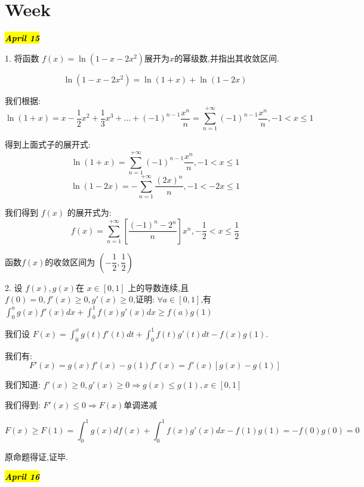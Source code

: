 \section{Week }
\hl{\textbf{\textit{April 15}}}

1. 将函数 $f(x)=\ln(1-x-2x^2)$展开为$x$的幂级数,并指出其收敛区间.
\begin{solution}
	$$\ln(1-x-2x^2)=\ln(1+x)+\ln(1-2x)$$
	
	我们根据: 
	$$\ln(1+x)=x-\frac{1}{2}x^2+\frac{1}{3}x^3+\dots+(-1)^{n-1}\frac{x^n}{n}=\sum\limits_{n=1}^{+\infty}(-1)^{n-1}\frac{x^n}{n},-1<x\leq 1$$
	
	得到上面式子的展开式: 
	$$\ln(1+x)=\sum\limits_{n=1}^{+\infty}(-1)^{n-1}\frac{x^n}{n},-1<x\leq 1$$
	$$\ln(1-2x)=-\sum\limits_{n=1}^{+\infty}\frac{(2x)^n}{n},-1<-2x\leq 1$$
	
	我们得到 $f(x)$ 的展开式为: 
	$$f(x)=\sum\limits_{n=1}^{+\infty}[\frac{(-1)^n-2^n}{n}]x^n,-\frac{1}{2}<x\leq \frac{1}{2}$$
	
	函数$f(x)$的收敛区间为 $(-\dfrac{1}{2},\dfrac{1}{2})$
\end{solution}

2. 设 $f(x),g(x)$在 $x\in[0,1]$ 上的导数连续,且 $f(0)=0,f'(x)\geq 0,g'(x)\geq 0$,证明: 
$\forall a\in[0,1]$,有 $\int_{0}^{a}g(x)f'(x)dx+\int_{0}^{1}f(x)g'(x)dx\geq f(a)g(1)$
\begin{solution}
	
	我们设 $F(x)=\int_{0}^{x}g(t)f'(t)dt+\int_{0}^{1}f(t)g'(t)dt-f(x)g(1)$.
	
	我们有: $$F'(x)=g(x)f'(x)-g(1)f'(x)=f'(x)[g(x)-g(1)]$$
	
	我们知道: $f'(x)\geq 0,g'(x)\geq 0\Rightarrow g(x)\leq g(1),x\in[0,1]$
	
	我们得到: $F'(x)\leq 0\Rightarrow F(x)\text{单调递减}$
	
	$$F(x)\geq F(1)=\int_{0}^{1}g(x)df(x)+\int_{0}^{1}f(x)g'(x)dx-f(1)g(1)=-f(0)g(0)=0$$
	
	原命题得证,证毕.
\end{solution}

\hl{\textbf{\textit{April 16}}}


